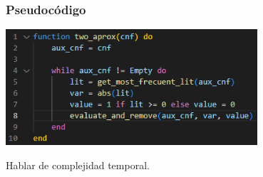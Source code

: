 \documentclass{article}
\begin{document}
        \subsubsection*{Pseudocódigo}
            \includegraphics[width = 0.7\textwidth]{resources/code5.png}

            Hablar de complejidad temporal.
        
        
\end{document}
